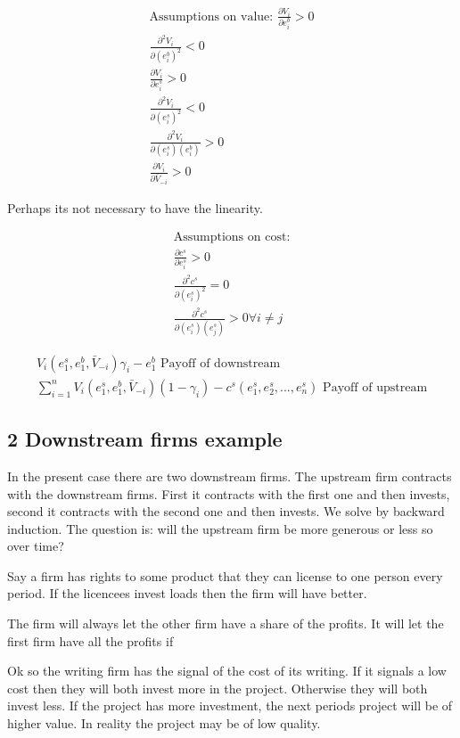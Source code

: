 \documentclass{article}
\begin{document}
\begin{align*}
\text{Assumptions on value: }
\frac{\partial V_i}{\partial e^b_i} >0 \\
\frac{\partial^2 V_i}{\partial (e^b_i)^2} <0 \\
\frac{\partial V_i}{\partial e^s_i} >0 \\
\frac{\partial^2 V_i}{\partial (e^s_i)^2} <0 \\
\frac{\partial^2 V_i}{\partial (e^s_i)(e^b_i)} >0 \\
\frac{\partial V_i}{\partial \bar{V}_{-i}} > 0
\end{align*}

Perhaps its not necessary to have the linearity. 

\begin{align*}
\text{Assumptions on cost:} \\
\frac{ \partial c^{s} }{ \partial e^s_i } > 0 \\
\frac{ \partial^2 c^s }{ \partial (e^s_i)^2 } = 0 \\
\frac{ \partial^2 c^s }{\partial (e^s_i)(e^s_j)}>0 \forall i \neq j
\end{align*}

\begin{align*}
V_i(e_1^s,e_1^b,\bar{V}_{-i} )\gamma_i-e_1^b \text{  Payoff of downstream} \\
\sum_{i=1}^n V_i(e_1^s,e_1^b,\bar{V}_{-i} )(1-\gamma_i)-c^s(e^s_1,e^s_2,...,e^s_n) \text{  Payoff of upstream}
\end{align*} 

\subsection{2 Downstream firms example}
In the present case there are two downstream firms. The upstream firm contracts with the downstream firms. First it contracts with the first one and then invests, second it contracts with the second one and then invests. We solve by backward induction. The question is: will the upstream firm be more generous or less so over time? 

Say a firm has rights to some product that they can license to one person every period. If the licencees invest loads then the firm will have better. 

The firm will always let the other firm have a share of the profits. It will let the first firm have all the profits if 

Ok so the writing firm has the signal of the cost of its writing. If it signals a low cost then they will both invest more in the project. Otherwise they will both invest less. If the project has more investment, the next periods project will be of higher value. In reality the project may be of low quality.
\end{document}
